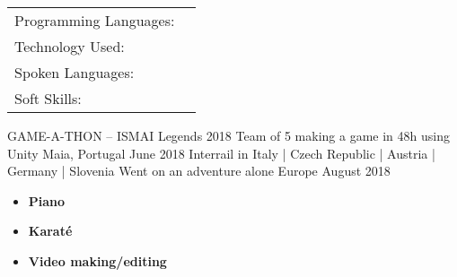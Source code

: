 \documentclass[]{awesome-cv}
\begin{document}
\vspace{-2mm}
\begin{cventries}
	\vspace{-2mm}
	\cventry
	{}
	{\def\arraystretch{1.15}{\begin{tabular}{ l l }
		Programming Languages:  & {\skill{ Java, JavaScript, C\#, PROLOG }} \\
		Technology Used:  & {\skill{ Angular, Node.js, .NET Core, Jira, Git, SonarQube, Jenkins, Oracle, Maven}} \\
		Spoken Languages:  & {\skill{ English, Portuguese, French, Spanish}} \\
		Soft Skills:  & {\skill{ Team work, Self-motivation, Creativity, Good communication}} \\
		\end{tabular}}}
	{}
	{}
	{}
\end{cventries}

\vspace{-2mm}
\begin{cvhonors}
	\cvhonor
	{GAME-A-THON – ISMAI Legends 2018}
	{Team of 5 making a game in 48h using Unity}
	{Maia, Portugal}
	{June 2018}
	\cvhonor
	{Interrail in Italy | Czech Republic | Austria | Germany | Slovenia}
	{Went on an adventure alone}
	{Europe}
	{August 2018}
\end{cvhonors}

\begin{itemize}
	\item \textbf{Piano} 
	\item \textbf{Karaté} 
	\item \textbf{Video making/editing} 

\end{itemize}

\
\end{document}
